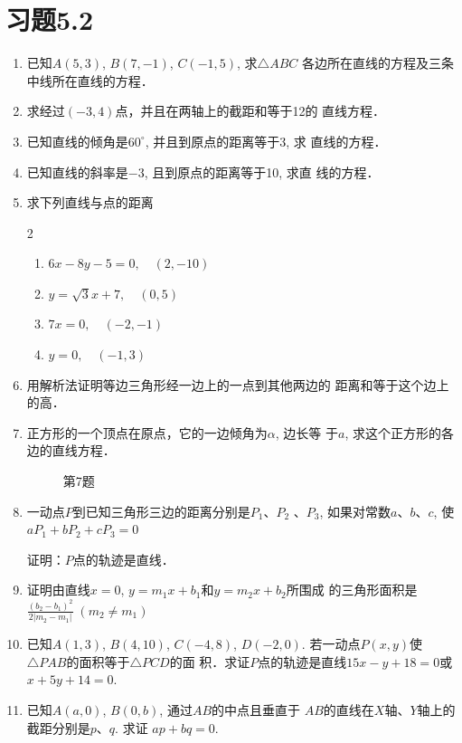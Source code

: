 \section*{习题5.2}

\begin{enumerate}
    \item 已知$A(5,3)$, $B(7,-1)$, $C(-1,5)$, 求$\triangle ABC$
    各边所在直线的方程及三条中线所在直线的方程．
    \item 求经过$(-3,4)$点，并且在两轴上的截距和等于12的
    直线方程．
    \item 已知直线的倾角是$60^{\circ}$, 并且到原点的距离等于3, 求
    直线的方程．
    \item 已知直线的斜率是$-3$, 且到原点的距离等于10, 求直
    线的方程．
    \item 求下列直线与点的距离
\begin{multicols}{2}
\begin{enumerate}
    \item $6x-8y-5=0,\quad (2,-10)$
    \item $y=\sqrt{3}x+7,\quad (0,5)$
    \item $7x=0,\quad (-2,-1)$
    \item $y=0,\quad (-1,3)$
\end{enumerate}
\end{multicols}

\item 用解析法证明等边三角形经一边上的一点到其他两边的
距离和等于这个边上的高．
\item 正方形的一个顶点在原点，它的一边倾角为$\alpha$, 边长等
于$a$, 求这个正方形的各边的直线方程．
\begin{figure}[htp]
    \centering
{}
    \caption*{第7题}
\end{figure}

\item 一动点$P$到已知三角形三边的距离分别是$P_1$、$P_2$
、$P_3$, 
如果对常数$a$、$b$、$c$, 使
$aP_1+bP_2+cP_3=0$

证明：$P$点的轨迹是直线．
\item 证明由直线$x=0$, $y=m_1x+b_1$和$y=m_2x+b_2$所围成
的三角形面积是
$\frac{(b_2-b_1)^2}{2|m_2-m_1|}\; (m_2\ne m_1)$
\item 已知$A(1,3)$, $B(4,10)$, $C(-4,8)$, $D(-2,0)$. 
若一动点$P(x,y)$使$\triangle PAB$的面积等于$\triangle PCD$的面
积．求证$P$点的轨迹是直线$15x-y+18=0$或$x+5y+
14=0$.
\item 已知$A(a,0)$, $B(0,b)$, 通过$AB$的中点且垂直于
$AB$的直线在$X$轴、$Y$轴上的截距分别是$p$、$q$. 求证
$ap+bq=0$.
\end{enumerate}

